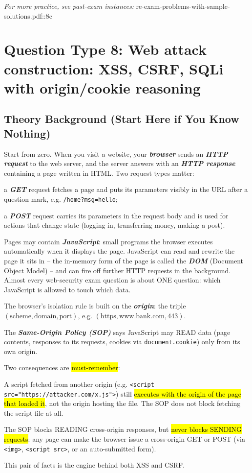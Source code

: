 \documentclass[12pt, a4paper]{article}
\newcommand{\term}[1]{\textbf{\textit{#1}}}        %
\newcommand{\imp}[1]{\hl{#1}}                       %
\begin{document}
\textit{For more practice, see past-exam instances:} re-exam-problems-with-sample-solutions.pdf::8c

\section{Question Type 8: Web attack construction: XSS, CSRF, SQLi with origin/cookie reasoning}

\subsection*{Theory Background (Start Here if You Know Nothing)}

Start from zero. When you visit a website, your \term{browser} sends an \term{HTTP request} to the web server, and the server answers with an \term{HTTP response} containing a page written in HTML. Two request types matter:
\begin{tightitem}
    \item a \term{GET} request fetches a page and puts its parameters visibly in the URL after a question mark, e.g. \texttt{/home?msg=hello};
    \item a \term{POST} request carries its parameters in the request body and is used for actions that change state (logging in, transferring money, making a post).
\end{tightitem}
Pages may contain \term{JavaScript}: small programs the browser executes automatically when it displays the page.
JavaScript can read and rewrite the page it sits in -- the in-memory form of the page is called the \term{DOM} (Document Object Model) -- and can fire off further HTTP requests in the background.
Almost every web-security exam question is about ONE question: which JavaScript is allowed to touch which data.

The browser's isolation rule is built on the \term{origin}: the triple $(\text{scheme}, \text{domain}, \text{port})$, e.g. $(\text{https}, \text{www.bank.com}, 443)$.

The \term{Same-Origin Policy (SOP)} says JavaScript may READ data (page contents, responses to its requests, cookies via \texttt{document.cookie}) only from its own origin.

Two consequences are \imp{must-remember}:
\begin{tightitem}
    \item A script fetched from another origin (e.g. \texttt{<script src="https://attacker.com/x.js">}) still \imp{executes with the origin of the page that loaded it}, not the origin hosting the file. The SOP does not block fetching the script file at all.
    \item The SOP blocks READING cross-origin responses, but \imp{never blocks SENDING requests}: any page can make the browser issue a cross-origin GET or POST (via \texttt{<img>}, \texttt{<script src>}, or an auto-submitted form).
\end{tightitem}
This pair of facts is the engine behind both XSS and CSRF.
\end{document}
